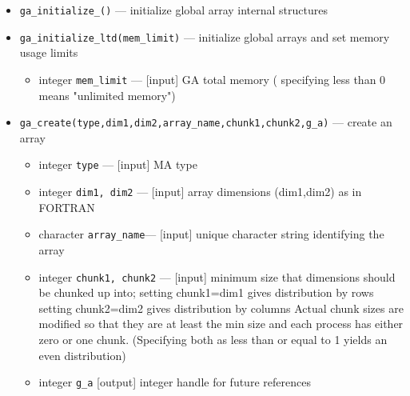 \begin{itemize}
\item {\tt ga\_initialize\_()} --- initialize global array internal
  structures
\item {\tt ga\_initialize\_ltd(mem\_limit)} --- initialize global arrays and set
  memory usage limits
\begin{itemize}
\item      integer {\tt mem\_limit}       --- [input] GA total memory ( specifying less than 0
means "unlimited memory")
\end{itemize}

\item {\tt ga\_create(type,dim1,dim2,array\_name,chunk1,chunk2,g\_a)} --- create an array
\begin{itemize}
\item     integer {\tt type}         --- [input] MA type
\item     integer {\tt dim1, dim2}   --- [input] array dimensions (dim1,dim2) as in FORTRAN
\item     character {\tt array\_name}--- [input] unique character string identifying the array
\item     integer {\tt chunk1, chunk2} --- [input] minimum size that dimensions should
                                         be chunked up into;
                                         setting chunk1=dim1 gives distribution by rows
                                         setting chunk2=dim2 gives distribution by columns 
                                         Actual chunk sizes are modified so that they are
                                         at least the min size and each process has either
                                         zero or one chunk. 
                                         (Specifying both as less than or equal to 1 
                                         yields an even distribution)
\item     integer {\tt g\_a}             [output] integer handle for future references
\end{itemize}


\end{itemize}
